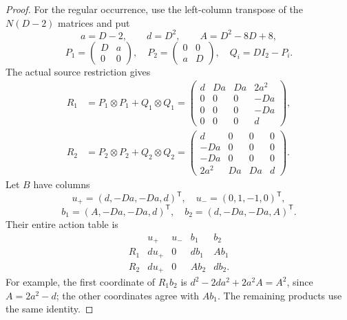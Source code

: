 \begin{proof}
For the regular occurrence, use the left-column transpose
of the  \(N(D-2)\) matrices and put
\[
 a=D-2,\qquad d=D^2,\qquad A=D^2-8D+8,
\]
\[
 P_1=\begin{pmatrix}D&a\\0&0\end{pmatrix},\quad
 P_2=\begin{pmatrix}0&0\\a&D\end{pmatrix},\quad
 Q_i=DI_2-P_i.
\]
The actual source restriction gives
\begin{equation}\label{eq:iteratedFourDimensionalMatrices}
 \begin{split}
 R_1&=P_1\otimes P_1+Q_1\otimes Q_1
  =\begin{pmatrix}
     d&Da&Da&2a^2\\
     0&0&0&-Da\\
     0&0&0&-Da\\
     0&0&0&d
    \end{pmatrix},\\
 R_2&=P_2\otimes P_2+Q_2\otimes Q_2
  =\begin{pmatrix}
     d&0&0&0\\
     -Da&0&0&0\\
     -Da&0&0&0\\
     2a^2&Da&Da&d
    \end{pmatrix}.
 \end{split}
\end{equation}
Let \(B\) have columns
\[
 u_+=(d,-Da,-Da,d)^{\mathsf T},\quad
 u_-=(0,1,-1,0)^{\mathsf T},
\]
\[
 b_1=(A,-Da,-Da,d)^{\mathsf T},\quad
 b_2=(d,-Da,-Da,A)^{\mathsf T}.
\]
Their entire action table is
\[
\begin{array}{c|rrrr}
 &u_+&u_-&b_1&b_2\\ \hline
 R_1&d u_+&0&d b_1&A b_1\\
 R_2&d u_+&0&A b_2&d b_2 .
\end{array}
\]
For example, the first coordinate of \(R_1b_2\) is
\(d^2-2da^2+2a^2A=A^2\), since \(A=2a^2-d\);
the other coordinates agree with \(A b_1\).
The remaining products use the same identity.


\end{proof}
